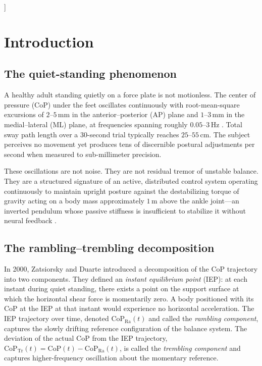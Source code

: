 \documentclass[11pt,twocolumn,a4paper]{article}
\theoremstyle{definition}
\theoremstyle{remark}
\newcommand{\Ra}{\mathrm{Ra}}
\newcommand{\Tr}{\mathrm{Tr}}
\begin{document}
\begin{abstract}
\vspace{4pt}
\noindent\textbf{Keywords:} postural control, rambling, trembling,
quiet standing, wearable sensors, inertial measurement units, center
of pressure, closed-loop motor control, dual-task, Parkinson's
disease, cerebellar ataxia, consumer health technology.
\end{abstract}
\vspace{12pt}%
]

\section{Introduction}
\label{sec:introduction}

\subsection{The quiet-standing phenomenon}

A healthy adult standing quietly on a force plate is not motionless.
The center of pressure (CoP) under the feet oscillates continuously
with root-mean-square excursions of $2$--$5$\,mm in the
anterior--posterior (AP) plane and $1$--$3$\,mm in the
medial--lateral (ML) plane, at frequencies spanning roughly
$0.05$--$3$\,Hz \citep{winter1998,maurer2005}. Total sway path
length over a $30$-second trial typically reaches
$25$--$55$\,cm. The subject perceives no movement yet produces tens
of discernible postural adjustments per second when measured to
sub-millimeter precision.

These oscillations are not noise. They are not residual tremor of
unstable balance. They are a structured signature of an active,
distributed control system operating continuously to maintain
upright posture against the destabilizing torque of gravity acting
on a body mass approximately $1$\,m above the ankle joint---an
inverted pendulum whose passive stiffness is insufficient to
stabilize it without neural feedback \citep{morasso2002,loram2002}.

\subsection{The rambling--trembling decomposition}

In 2000, Zatsiorsky and Duarte \citep{zatsiorsky2000} introduced a
decomposition of the CoP trajectory into two components. They
defined an \emph{instant equilibrium point} (IEP): at each instant
during quiet standing, there exists a point on the support surface
at which the horizontal shear force is momentarily zero. A body
positioned with its CoP at the IEP at that instant would experience
no horizontal acceleration. The IEP trajectory over time, denoted
$\mathrm{CoP}_{\Ra}(t)$ and called the \emph{rambling component},
captures the slowly drifting reference configuration of the balance
system. The deviation of the actual CoP from the IEP trajectory,
$\mathrm{CoP}_{\Tr}(t) = \mathrm{CoP}(t) - \mathrm{CoP}_{\Ra}(t)$,
is called the \emph{trembling component} and captures higher-frequency
oscillation about the momentary reference.
\end{document}
